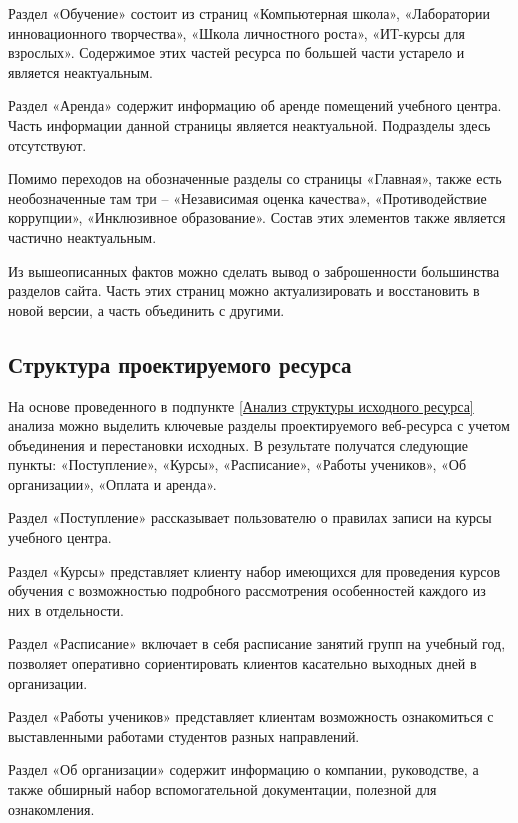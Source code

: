 Раздел «Обучение» состоит из страниц «Компьютерная школа», «Лаборатории инновационного творчества», «Школа личностного роста», «ИТ-курсы для взрослых».
Содержимое этих частей ресурса по большей части устарело и является неактуальным.

Раздел «Аренда» содержит информацию об аренде помещений учебного центра.
Часть информации данной страницы является неактуальной.
Подразделы здесь отсутствуют.

Помимо переходов на обозначенные разделы со страницы «Главная», также есть необозначенные там три -- «Независимая оценка качества», «Противодействие коррупции», «Инклюзивное образование».
Состав этих элементов также является частично неактуальным.


Из вышеописанных фактов можно сделать вывод о заброшенности большинства разделов сайта.
Часть этих страниц можно актуализировать и восстановить в новой версии, а часть объединить с другими.


\subsection{Структура проектируемого ресурса}

На основе проведенного в подпункте \ref{Анализ структуры исходного ресурса} анализа можно выделить ключевые разделы проектируемого веб-ресурса с учетом объединения и перестановки исходных.
В результате получатся следующие пункты: «Поступление», «Курсы», «Расписание», «Работы учеников», «Об организации», «Оплата и аренда».

Раздел «Поступление» рассказывает пользователю о правилах записи на курсы учебного центра.

Раздел «Курсы» представляет клиенту набор имеющихся для проведения курсов обучения с возможностью подробного рассмотрения особенностей каждого из них в отдельности.

Раздел «Расписание» включает в себя расписание занятий групп на учебный год, позволяет оперативно сориентировать клиентов касательно выходных дней в организации.

Раздел «Работы учеников» представляет клиентам возможность ознакомиться с выставленными работами студентов разных направлений.

Раздел «Об организации» содержит информацию о компании, руководстве, а также обширный набор вспомогательной документации, полезной для ознакомления.

